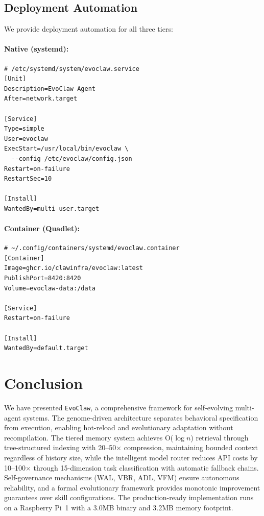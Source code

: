 \documentclass[conference]{IEEEtran}
\newcommand{\evoclaw}{\texttt{EvoClaw}\xspace}
\begin{document}
\subsection{Deployment Automation}

We provide deployment automation for all three tiers:

\paragraph{Native (systemd):}
\begin{lstlisting}[basicstyle=\ttfamily\footnotesize]
# /etc/systemd/system/evoclaw.service
[Unit]
Description=EvoClaw Agent
After=network.target

[Service]
Type=simple
User=evoclaw
ExecStart=/usr/local/bin/evoclaw \
  --config /etc/evoclaw/config.json
Restart=on-failure
RestartSec=10

[Install]
WantedBy=multi-user.target
\end{lstlisting}

\paragraph{Container (Quadlet):}
\begin{lstlisting}[basicstyle=\ttfamily\footnotesize]
# ~/.config/containers/systemd/evoclaw.container
[Container]
Image=ghcr.io/clawinfra/evoclaw:latest
PublishPort=8420:8420
Volume=evoclaw-data:/data

[Service]
Restart=on-failure

[Install]
WantedBy=default.target
\end{lstlisting}


\section{Conclusion}
\label{sec:conclusion}

We have presented \evoclaw{}, a comprehensive framework for self-evolving multi-agent systems. The genome-driven architecture separates behavioral specification from execution, enabling hot-reload and evolutionary adaptation without recompilation. The tiered memory system achieves O($\log n$) retrieval through tree-structured indexing with 20--50$\times$ compression, maintaining bounded context regardless of history size, while the intelligent model router reduces API costs by 10--100$\times$ through 15-dimension task classification with automatic fallback chains. Self-governance mechanisms (WAL, VBR, ADL, VFM) ensure autonomous reliability, and a formal evolutionary framework provides monotonic improvement guarantees over skill configurations. The production-ready implementation runs on a Raspberry Pi~1 with a 3.0MB binary and 3.2MB memory footprint.
\end{document}
